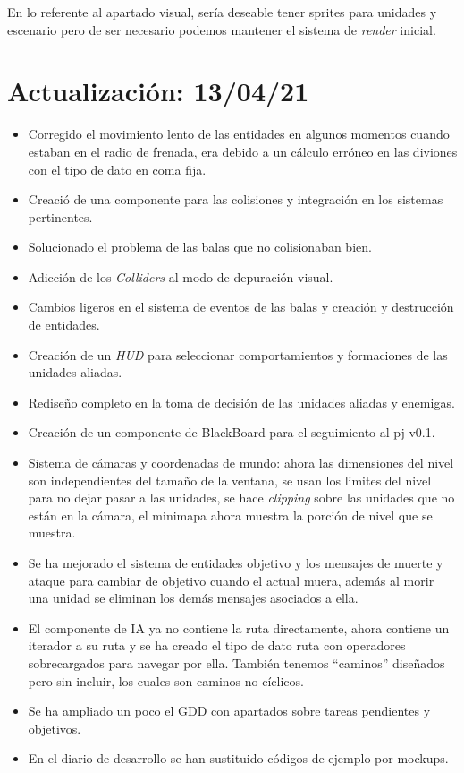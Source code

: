 En lo referente al apartado visual, sería deseable tener sprites para unidades y escenario pero
de ser necesario podemos mantener el sistema de \textit{render} inicial.


\section{Actualización: 13/04/21}
\begin{itemize}
	\item Corregido el movimiento lento de las entidades en algunos momentos cuando estaban en el radio
	de frenada, era debido a un cálculo erróneo en las diviones con el tipo de dato en coma fija.
	
	\item Creació de una componente para las colisiones y integración en los sistemas pertinentes.
	
	\item Solucionado el problema de las balas que no colisionaban bien.
	
	\item Adicción de los \textit{Colliders} al modo de depuración visual.
	
	\item Cambios ligeros en el sistema de eventos de las balas y creación y destrucción de entidades.
	
	\item Creación de un \textit{HUD} para seleccionar comportamientos y formaciones de las unidades
	aliadas.
	
	\item Rediseño completo en la toma de decisión de las unidades aliadas y enemigas.

	\item Creación de un componente de BlackBoard para el seguimiento al pj v0.1.
	
	\item Sistema de cámaras y coordenadas de mundo: ahora las dimensiones del nivel son independientes
	del tamaño de la ventana, se usan los limites del nivel para no dejar pasar a las unidades, se hace
	\textit{clipping} sobre las unidades que no están en la cámara, el minimapa ahora muestra la porción
	de nivel que se muestra.
	
	\item Se ha mejorado el sistema de entidades objetivo y los mensajes de muerte y ataque para cambiar
	de objetivo cuando el actual muera, además al morir una unidad se eliminan los demás mensajes asociados
	a ella.

	\item El componente de \ac{IA} ya no contiene la ruta directamente, ahora contiene un iterador a su
	ruta y se ha creado el tipo de dato ruta con operadores sobrecargados para navegar por ella. También
	tenemos ``caminos'' diseñados pero sin incluir, los cuales son caminos no cíclicos.

	\item Se ha ampliado un poco el GDD con apartados sobre tareas pendientes y objetivos.

	\item En el diario de desarrollo se han sustituido códigos de ejemplo por mockups.  
\end{itemize}

